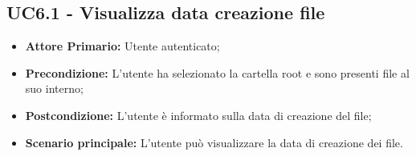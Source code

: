 \subsection{UC6.1 - Visualizza data creazione file}
\begin{itemize}
\item \textbf{Attore Primario:} Utente autenticato;
\item \textbf{Precondizione:} L'utente ha selezionato la cartella root e sono presenti file al suo interno;
\item \textbf{Postcondizione:} L'utente è informato sulla data di creazione del file;
\item \textbf{Scenario principale:} L'utente può visualizzare la data di creazione dei file.
\end{itemize}